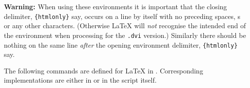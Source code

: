\smallskip\noindent
\textbf{Warning: \label{env:warn}}
When using these environments it is important
that the closing delimiter, \verb|{htmlonly}| say, occurs
on a line by itself with no preceding spaces, s 
or any other characters. 
(Otherwise \LaTeX{} will \emph{not} recognise the intended end 
of the environment when processing for the \texttt{.dvi} version.)
Similarly there should be nothing on the same line \emph{after}
the opening environment delimiter, \verb|{htmlonly}| say.

\medskip
\htmlrule[width=300]
\medskip\noindent
The following commands are defined for \LaTeX{} in .\html{\\}
Corresponding \Perl{} implementations are either in  
or in the  script itself.
%
%
%
